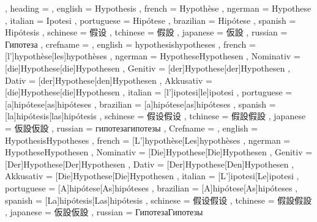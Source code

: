   {
    , heading =   {
                    , english     = Hypothesis
                    , french      = Hypothèse
                    , ngerman     = Hypothese
                    , italian     = Ipotesi
                    , portuguese  = Hipótese
                    , brazilian   = Hipótese
                    , spanish     = Hipótesis
                    , schinese    = 假设
                    , tchinese    = 假設
                    , japanese    = 仮設
                    , russian     = Гипотеза
                  }
    , crefname =  {
                    , english     = {hypothesis}{hypotheses}
                    , french      = [l']{hypothèse}[les]{hypothèses}
                    , ngerman     = { {Hypothese}{Hypothesen}
                                      , Nominativ = [die]{Hypothese}[die]{Hypothesen}
                                      , Genitiv   = [der]{Hypothese}[der]{Hypothesen}
                                      , Dativ     = [der]{Hypothese}[den]{Hypothesen}
                                      , Akkusativ = [die]{Hypothese}[die]{Hypothesen}
                                    }
                    , italian     = [l']{ipotesi}[le]{ipotesi}
                    , portuguese  = [a]{hipótese}[as]{hipóteses}
                    , brazilian   = [a]{hipótese}[as]{hipóteses}
                    , spanish     = [la]{hipótesis}[las]{hipótesis}
                    , schinese    = {假设}{假设}
                    , tchinese    = {假設}{假設}
                    , japanese    = {仮設}{仮設}
                    , russian     = {гипотеза}{гипотезы}
                  }
    , Crefname =  {
                    , english     = {Hypothesis}{Hypotheses}
                    , french      = [L']{hypothèse}[Les]{hypothèses}
                    , ngerman     = { {Hypothese}{Hypothesen}
                                      , Nominativ = [Die]{Hypothese}[Die]{Hypothesen}
                                      , Genitiv   = [Der]{Hypothese}[Der]{Hypothesen}
                                      , Dativ     = [Der]{Hypothese}[Den]{Hypothesen}
                                      , Akkusativ = [Die]{Hypothese}[Die]{Hypothesen}
                                    }
                    , italian     = [L']{ipotesi}[Le]{ipotesi}
                    , portuguese  = [A]{hipótese}[As]{hipóteses}
                    , brazilian   = [A]{hipótese}[As]{hipóteses}
                    , spanish     = [La]{hipótesis}[Las]{hipótesis}
                    , schinese    = {假设}{假设}
                    , tchinese    = {假設}{假設}
                    , japanese    = {仮設}{仮設}
                    , russian     = {Гипотеза}{Гипотезы}
                  }
  }

